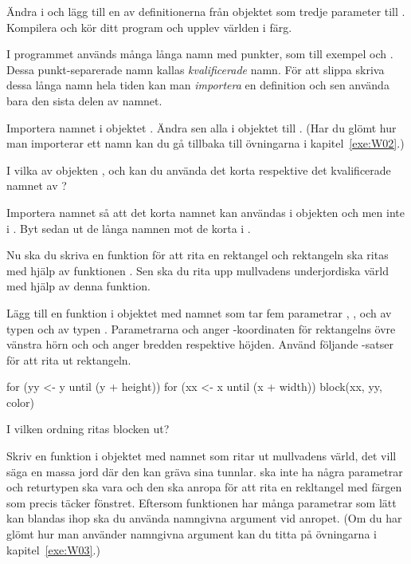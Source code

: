 \Subtask
Ändra i  och lägg till en av definitionerna från objektet  som tredje parameter till .
Kompilera och kör ditt program och upplev världen i färg.

\Task
I programmet används många långa namn med punkter, som till exempel  och .
Dessa punkt-separerade namn kallas \emph{kvalificerade} namn.
För att slippa skriva dessa långa namn hela tiden kan man \emph{importera} en definition och sen använda bara den sista delen av namnet.

\Subtask
Importera namnet  i objektet . Ändra sen alla  i objektet till .
(Har du glömt hur man importerar ett namn kan du gå tillbaka till övningarna i kapitel~\ref{exe:W02}.)

\Subtask\Pen
I vilka av objekten ,  och  kan du använda det korta respektive det kvalificerade namnet av ?

\Subtask
Importera namnet  så att det korta namnet  kan användas i objekten  och  men inte i .
Byt sedan ut de långa namnen mot de korta i .

\Task
Nu ska du skriva en funktion för att rita en rektangel och rektangeln ska ritas med hjälp av funktionen .
Sen ska du rita upp mullvadens underjordiska värld med hjälp av denna funktion.

\Subtask
Lägg till en funktion i objektet  med namnet  som tar fem parametrar , ,  och  av typen  och  av typen .
Parametrarna  och  anger -koordinaten för rektangelns övre vänstra hörn och  och  anger bredden respektive höjden.
Använd följande -satser för att rita ut rektangeln.
\begin{Code}
for (yy <- y until (y + height)) {
	for (xx <- x until (x + width)) {
		block(xx, yy, color)
	}
}
\end{Code}

\Subtask\Pen
I vilken ordning ritas blocken ut?


\Subtask
Skriv en funktion i objektet  med namnet  som ritar ut mullvadens värld, det vill säga en massa jord där den kan gräva sina tunnlar.
 ska inte ha några parametrar och returtypen ska vara  och den ska anropa  för att rita en rekltangel med färgen  som precis täcker fönstret.
Eftersom funktionen har många parametrar som lätt kan blandas ihop ska du använda namngivna argument vid anropet.
(Om du har glömt hur man använder namngivna argument kan du titta på övningarna i kapitel~\ref{exe:W03}.)

